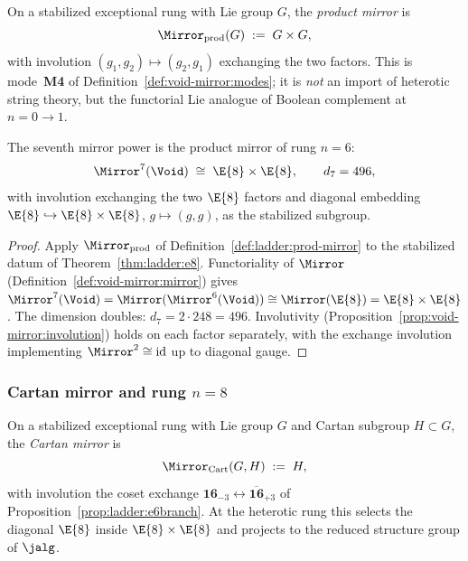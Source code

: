 \begin{definition}\label{def:ladder:prod-mirror}
On a stabilized exceptional rung with Lie group $G$, the \emph{product
mirror} is
\begin{equation}\label{eq:ladder:prod-mirror}
  \Mirror_{\mathrm{prod}}(G)\;:=\;G\times G,
\end{equation}
with involution $(g_1,g_2)\mapsto(g_2,g_1)$ exchanging the two factors. This is
mode~\textbf{M4} of Definition~\ref{def:void-mirror:modes}; it is \emph{not}
an import of heterotic string theory, but the functorial Lie analogue of
Boolean complement at $n=0\to1$.
\end{definition}

\begin{theorem}[Exceptional rung $n=7$]\label{thm:ladder:e8e8}
The seventh mirror power is the product mirror of rung $n=6$:
\begin{equation}\label{eq:ladder:mirror7}
  \Mirror^7(\Void)\;\cong\;\E{8}\times\E{8},
  \qquad d_7=496,
\end{equation}
with involution exchanging the two $\E{8}$ factors and diagonal embedding
$\E{8}\hookrightarrow\E{8}\times\E{8}$, $g\mapsto(g,g)$, as the stabilized
subgroup.
\end{theorem}

\begin{proof}
Apply $\Mirror_{\mathrm{prod}}$ of Definition~\ref{def:ladder:prod-mirror} to
the stabilized datum of Theorem~\ref{thm:ladder:e8}. Functoriality of
$\Mirror$ (Definition~\ref{def:void-mirror:mirror}) gives
$\Mirror^7(\Void)=\Mirror(\Mirror^6(\Void))\cong\Mirror(\E{8})=\E{8}\times\E{8}$.
The dimension doubles: $d_7=2\cdot 248=496$. Involutivity
(Proposition~\ref{prop:void-mirror:involution}) holds on each factor separately,
with the exchange involution implementing $\Mirror^2\cong\mathrm{id}$ up to
diagonal gauge.
\end{proof}

\subsubsection{Cartan mirror and rung $n=8$}
\label{sec:ladder:mirror-e6}

\begin{definition}\label{def:ladder:cartan-mirror}
On a stabilized exceptional rung with Lie group $G$ and Cartan subgroup
$H\subset G$, the \emph{Cartan mirror} is
\begin{equation}\label{eq:ladder:cartan-mirror}
  \Mirror_{\mathrm{Cart}}(G,H)\;:=\;H,
\end{equation}
with involution the coset exchange
$\mathbf{16}_{-3}\leftrightarrow\overline{\mathbf{16}}_{+3}$ of
Proposition~\ref{prop:ladder:e6branch}. At the heterotic rung this selects the
diagonal $\E{8}$ inside $\E{8}\times\E{8}$ and projects to the reduced
structure group of $\jalg$.
\end{definition}

